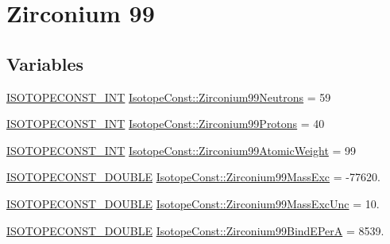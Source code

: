 \hypertarget{group___isotope_const-_zirconium-_zr99}{}\section{Zirconium 99}
\label{group___isotope_const-_zirconium-_zr99}
\subsection*{Variables}
\begin{DoxyCompactItemize}
\item 
\mbox{\hyperlink{group___isotope_const-_macros_ga5f18360b3e99483a35c32d789e62621c}{I\+S\+O\+T\+O\+P\+E\+C\+O\+N\+S\+T\+\_\+\+I\+NT}} \mbox{\hyperlink{group___isotope_const-_zirconium-_zr99_ga1f234ae847639741e425271eded9933b}{Isotope\+Const\+::\+Zirconium99\+Neutrons}} = 59
\item 
\mbox{\hyperlink{group___isotope_const-_macros_ga5f18360b3e99483a35c32d789e62621c}{I\+S\+O\+T\+O\+P\+E\+C\+O\+N\+S\+T\+\_\+\+I\+NT}} \mbox{\hyperlink{group___isotope_const-_zirconium-_zr99_gad077a684a585ad41fb36db051e92979f}{Isotope\+Const\+::\+Zirconium99\+Protons}} = 40
\item 
\mbox{\hyperlink{group___isotope_const-_macros_ga5f18360b3e99483a35c32d789e62621c}{I\+S\+O\+T\+O\+P\+E\+C\+O\+N\+S\+T\+\_\+\+I\+NT}} \mbox{\hyperlink{group___isotope_const-_zirconium-_zr99_gae742f9349013275b2c248203f0b865ae}{Isotope\+Const\+::\+Zirconium99\+Atomic\+Weight}} = 99
\item 
\mbox{\hyperlink{group___isotope_const-_macros_ga8f45a7272ce02c0b4c65c44636ed719a}{I\+S\+O\+T\+O\+P\+E\+C\+O\+N\+S\+T\+\_\+\+D\+O\+U\+B\+LE}} \mbox{\hyperlink{group___isotope_const-_zirconium-_zr99_ga0339c554f05415e0d38df2c5012c45a7}{Isotope\+Const\+::\+Zirconium99\+Mass\+Exc}} = -\/77620.
\item 
\mbox{\hyperlink{group___isotope_const-_macros_ga8f45a7272ce02c0b4c65c44636ed719a}{I\+S\+O\+T\+O\+P\+E\+C\+O\+N\+S\+T\+\_\+\+D\+O\+U\+B\+LE}} \mbox{\hyperlink{group___isotope_const-_zirconium-_zr99_ga6ab98b15afa53f8f92901f96455e0e2f}{Isotope\+Const\+::\+Zirconium99\+Mass\+Exc\+Unc}} = 10.
\item 
\mbox{\hyperlink{group___isotope_const-_macros_ga8f45a7272ce02c0b4c65c44636ed719a}{I\+S\+O\+T\+O\+P\+E\+C\+O\+N\+S\+T\+\_\+\+D\+O\+U\+B\+LE}} \mbox{\hyperlink{group___isotope_const-_zirconium-_zr99_gaad0a9555aa911f117801bf3678c89cbb}{Isotope\+Const\+::\+Zirconium99\+Bind\+E\+PerA}} = 8539.
\item 

\end{DoxyCompactItemize}
